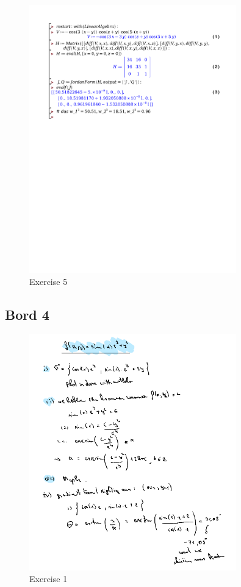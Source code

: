 \documentclass[a4paper]{article}
\begin{document}
\begin{figure}[H]
	\centering
	\includegraphics[width=0.8\textwidth]{exercises/huis_4_ex_5.pdf}
	\caption{Exercise 5}
	\label{fig:huis_4_ex_5}
\end{figure}

\subsection*{Bord 4}

\begin{figure}[H]
	\centering
	\includegraphics[width=0.8\textwidth]{assets/bord_4_ex_1.png}
	\caption{Exercise 1}
	\label{fig:bord_4_ex_1}
\end{figure}
\end{document}
